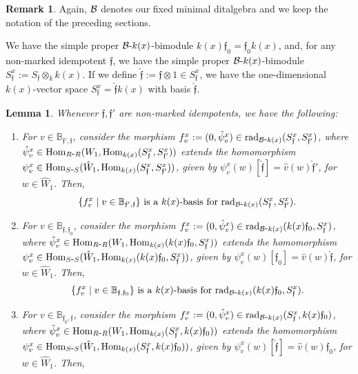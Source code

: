 \documentclass{article}
\newtheorem{lemma}[theorem]{Lemma}
\theoremstyle{definition}
\newtheorem{remark}[theorem]{Remark}
\newcommand{\Hom}{{ \rm Hom }}
\newcommand{\rad}{{ \rm rad }}
\renewcommand{\frak}{\mathfrak}
\newcommand{\g}{\hbox{-}}
\newcommand{\hueca}[1]{\mathbb{#1}}
\begin{document}
 \begin{remark}\label{R: introd de S(super x)} 
Again, ${\cal B}$ denotes our fixed minimal ditalgebra and we keep the notation of the preceding sections. 

 We have the simple proper ${\cal B}\g k(x)$-bimodule $k(x)\frak{f}_0=\frak{f}_0k(x)$, and, for any non-marked idempotent $\frak{f}$, we have the simple proper ${\cal B}\g k(x)$-bimodule $S^x_\frak{f}:=S_\frak{f}\otimes_kk(x)$. If we define  $\hat{\frak{f}}:=\frak{f}\otimes 1\in S_\frak{f}^x$, we have the one-dimensional $k(x)$-vector space $S_\frak{f}^x=\hat{\frak{f}}k(x)$ with basis $\hat{\frak{f}}$. 
\end{remark}

 

\begin{lemma}\label{L: k(x)-bases para rad entre bimodulos simples} Whenever $\frak{f},\frak{f}'$ are non-marked idempotents, we have the following:  
\begin{enumerate}
\item  For  $v\in \hueca{B}_{\frak{f}',\frak{f}}$, consider the morphism  $f^x_v:=(0,\hat{\psi}^x_v)\in \rad_{{\cal B}\g k(x)}(S_\frak{f}^x,S^x_{\frak{f}'})$, where   $\hat{\psi}^x_v\in \Hom_{R\g R}(W_1,\Hom_{k(x)}(S^x_\frak{f},S^x_{\frak{f}'}))$ extends the homomorphism $\psi^x_v\in \Hom_{S\g S}(\hat{W}_1,\Hom_{k(x)}(S^x_\frak{f},S^x_{\frak{f}'}))$, given by  
$\psi^x_v(w)[\hat{\frak{f}}]=\hat{v}(w)\hat{\frak{f}}'$, for $w\in \hat{W}_1$. Then,    
$$\{f^x_v\mid v\in \hueca{B}_{\frak{f}',\frak{f}}\}\hbox{ is a $k(x)$-basis for }
\rad_{{\cal B}\g k(x)}(S^x_\frak{f},S^x_{\frak{f}'}).$$   
 \item  For  $v\in \hueca{B}_{\frak{f},\frak{f}_0}$, consider the morphism  $f^x_v:=(0,\hat{\psi}^x_v)\in \rad_{{\cal B}\g k(x)}(k(x)\frak{f}_0,S^x_{\frak{f}})$, where   $\hat{\psi}^x_v\in \Hom_{R\g R}(W_1,\Hom_{k(x)}(k(x)\frak{f}_0,S^x_{\frak{f}}))$ extends the homomorphism  $\psi^x_v\in \Hom_{S\g S}(\hat{W}_1,\Hom_{k(x)}(k(x)\frak{f}_0,S^x_{\frak{f}}))$, given by  $\psi^x_v(w)[\frak{f}_0]=\hat{v}(w)\hat{\frak{f}}$, for $w\in \hat{W}_1$. Then,  
$$\{f^x_v\mid v\in \hueca{B}_{\frak{f},\frak{f}_0}\}\hbox{ is a $k(x)$-basis for }\rad_{{\cal B}\g k(x)}(k(x)\frak{f}_0,S^x_{\frak{f}}).$$ 
\item For  
$v\in \hueca{B}_{\frak{f}_0,\frak{f}}$, consider the morphism  $f^x_v:=(0,\hat{\psi}^x_v)\in \rad_{{\cal B}\g k(x)}(S^x_{\frak{f}},k(x)\frak{f}_0)$, where   $\hat{\psi}^x_v\in \Hom_{R\g R}(W_1,\Hom_{k(x)}(S^x_{\frak{f}},k(x)\frak{f}_0))$ extends the homomorphism  $\psi^x_v\in \Hom_{S\g S}(\hat{W}_1,\Hom_{k(x)}(S^x_{\frak{f}},k(x)\frak{f}_0))$, given by  $\psi^x_v(w)[\hat{\frak{f}}]=\hat{v}(w)\frak{f}_0$, for $w\in \hat{W}_1$. Then,  

\end{enumerate}
\end{lemma}
\end{document}
